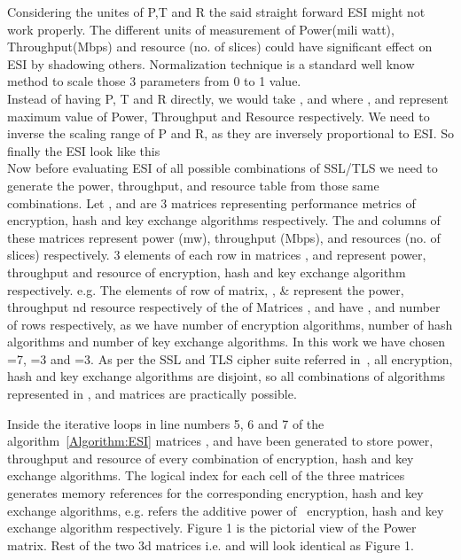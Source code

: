 \documentclass[3p,times]{elsarticle}
\begin{document}
Considering the unites of P,T and R the said straight forward ESI might  not work properly. The different units of measurement of Power(mili watt), Throughput(Mbps) and resource (no. of slices) could have significant effect on ESI by shadowing others. Normalization technique is a standard well know method to scale those 3 parameters from 0 to 1 value.\\
 Instead of having P, T and R directly, we would take ,  and  where ,  and  represent maximum value of Power, Throughput and Resource respectively. We need to inverse the scaling range of P and R, as they are inversely proportional to ESI. So finally the ESI look like this\\

Now before evaluating ESI of all possible combinations of SSL/TLS we need to generate the power, throughput, and resource table from those same combinations.
 Let ,  and  are 3 matrices representing performance metrics of encryption, hash and key exchange algorithms respectively. The  and  columns of these matrices represent power (mw), throughput (Mbps), and resources (no. of slices) respectively. 3 elements of each row in matrices ,  and  represent power, throughput and resource of encryption, hash and key exchange algorithm respectively. e.g. The elements of  row of  matrix, ,  \&  represent the power, throughput nd resource respectively of the  of  Matrices ,  and  have ,  and  number of rows respectively, as we have  number of encryption algorithms,  number of hash algorithms and  number of key exchange algorithms. In this work we have chosen =7, =3 and =3. As per the SSL and TLS cipher suite referred in~\cite{Forouzan:book}, all encryption, hash and key exchange algorithms are disjoint, so all combinations of algorithms represented in ,  and  matrices are practically possible.


 
\vspace{-2 pt}
\vspace{-2 pt}
 
Inside the iterative loops in line numbers 5, 6 and 7 of the algorithm~\ref{Algorithm:ESI} matrices ,  and  have been generated to store power, throughput and resource of every combination of encryption, hash and key exchange algorithms. The logical index for each cell of the three matrices generates memory references for the corresponding encryption, hash and key exchange algorithms, e.g.  refers the additive power of~ encryption,  hash and key exchange algorithm respectively. Figure 1 is the pictorial view of the Power matrix. Rest of the two 3d matrices i.e.  and  will look identical as Figure 1.
\end{document}
